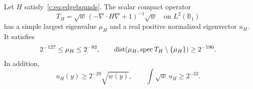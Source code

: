 \begin{lemma}
\label{c:lem:perron}
Let $H$ satisfy~\eqref{c:eq:edgebounds}. The scalar compact operator
\begin{equation}
 T_H=\sqrt w\,(-\nabla\cdot H\nabla+1)^{-1}\sqrt w
 \quad\text{on }L^2(\mathbb B_1)                              \label{c:eq:TA}
\end{equation}
has a simple largest eigenvalue $\mu_H$ and a real positive normalized
eigenvector $u_H$. It satisfies
\begin{equation}
 2^{-127}\le\mu_H\le2^{-92},\qquad
 \operatorname{dist}(\mu_H,\operatorname{spec} T_H\setminus\{\mu_H\})\ge2^{-190}.
                                                               \label{c:eq:perrongap}
\end{equation}
In addition,
\begin{equation}
 u_H(y)\ge2^{-29}\sqrt{w(y)},\qquad
 \int\sqrt w\,u_H\ge2^{-32}.                         \label{c:eq:perronoverlap}
\end{equation}
\end{lemma}
